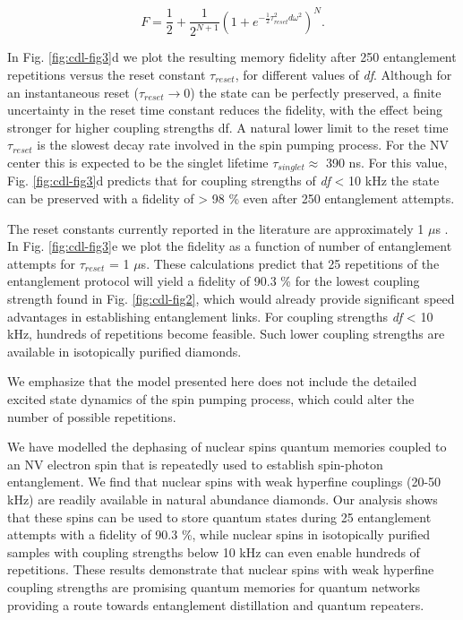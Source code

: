 \begin{equation}\label{eq:CDL-deph_an}
F = \frac{1}{2} + \frac{1}{2^{N+1}}\left(1 + e^{-\frac{1}{2}\tau_{reset} ^2 d\omega^2}\right)^N.
\end{equation}

In Fig. \ref{fig:cdl-fig3}d we plot the resulting memory fidelity after 250 entanglement repetitions versus the reset constant $\tau_{reset}$, for different values of \textit{df}. Although for an instantaneous reset ($\tau_{reset} \to 0$) the state can be perfectly preserved, a finite uncertainty in the reset time constant reduces the fidelity, with the effect being stronger for higher coupling strengths df. A natural lower limit to the reset time $\tau_{reset}$ is the slowest decay rate involved in the spin pumping process. For the NV center this is expected to be the singlet lifetime $\tau_{singlet} \approx$ 390 ns\cite{Doherty_PhysicsReports_2013}.  For this value, Fig. \ref{fig:cdl-fig3}d predicts that for coupling strengths of \textit{df} < 10 kHz the state can be preserved with a fidelity of > 98 \% even after 250 entanglement attempts. 

The reset constants currently reported in the literature are approximately 1 $\mu$s \cite{Bernien_Nature_2013}. In Fig. \ref{fig:cdl-fig3}e we plot the fidelity as a function of number of entanglement attempts for $\tau_{reset}$ = 1 $\mu$s. These calculations predict that 25 repetitions of the entanglement protocol will yield a fidelity of 90.3 \% for the lowest coupling strength found in Fig. \ref{fig:cdl-fig2}, which would already provide significant speed advantages in establishing entanglement links\cite{Campbell_Phys.Rev.Lett._2008}. For coupling strengths \textit{df} < 10 kHz, hundreds of repetitions become feasible. Such lower coupling strengths are available in isotopically purified diamonds\cite{Maurer_Science_2012}.

We emphasize that the model presented here does not include the detailed excited state dynamics of the spin pumping process, which could alter the number of possible repetitions.

We have modelled the dephasing of nuclear spins quantum memories coupled to an NV electron spin that is repeatedly used to establish spin-photon entanglement. We find that nuclear spins with weak hyperfine couplings (20-50 kHz) are readily available in natural abundance diamonds. Our analysis shows that these spins can be used to store quantum states during 25 entanglement attempts with a fidelity of 90.3 \%, while nuclear spins in isotopically purified samples with coupling strengths below 10 kHz can even enable hundreds of repetitions. These results demonstrate that nuclear spins with weak hyperfine coupling strengths are promising quantum memories for quantum networks providing a route towards entanglement distillation and quantum repeaters.

